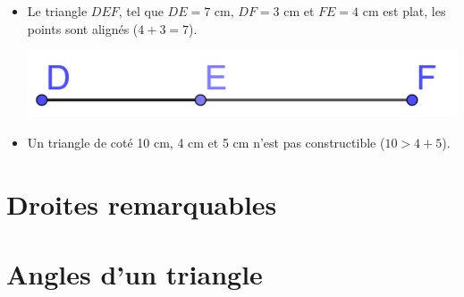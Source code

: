 \documentclass[xcolor={dvipsnames}]{beamer}
\begin{document}
\begin{frame}
	\begin{myexs}
		
		\begin{itemize}
			\item Le triangle $DEF$, tel que $DE = 7$ cm, $DF = 3$ cm et $FE = 4$ cm est plat, les points sont alignés ($4 + 3 = 7$).
			\begin{center}
				
				\includegraphics[scale=0.2]{triangle2}\pause
			\end{center}
			
			\item 	Un triangle de coté 10 cm, 4 cm et 5 cm n'est pas constructible ($10 > 4 + 5$).
		\end{itemize}
		
		
		
	\end{myexs}
\end{frame}

\section{Droites remarquables}

\section{Angles d'un triangle}
\end{document}
